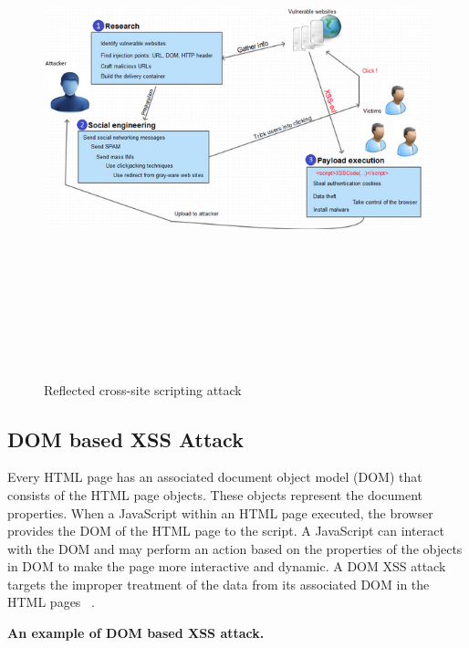 \begin{figure}[htb]
\centering
\includegraphics[width=15cm,height=15cm,keepaspectratio]{image/rxss.png}
\caption[Reflected cross-site scripting attack]{Reflected cross-site scripting attack ~\cite{g13}} 
\label{fig:rxss}
\end{figure}

\newpage

\subsection{DOM based XSS Attack}

Every HTML page has an associated document object model (DOM) that consists of the HTML page objects. These objects represent the document properties. When a JavaScript within an HTML page executed, the browser provides the DOM of the HTML page to the script. A JavaScript can interact with the DOM and may perform an action based on the properties of the objects in DOM to make the page more interactive and dynamic. A DOM XSS attack targets the improper treatment of the data from its associated DOM in the HTML pages ~\cite{g20}.

{\bf An example of DOM based XSS attack.}

